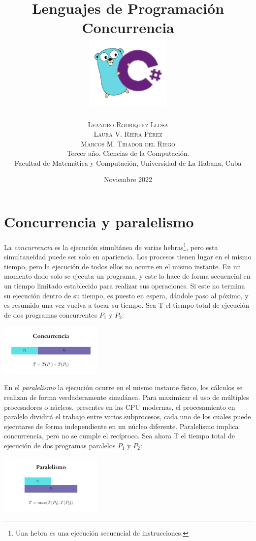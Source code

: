 \documentclass[10pt]{article} %
\title{\normalsize{Lenguajes de Programaci\'on}\\
\Huge\bfseries Concurrencia\\
\includegraphics[height=5em]{go_cs_logo.png}} %
\author{%
\normalsize\textsc{Leandro Rodr\'iquez Llosa}\\
\normalsize\textsc{Laura V. Riera P\'erez}\\ 
\normalsize\textsc{Marcos M. Tirador del Riego} \\[2ex]
\small Tercer a\~no. Ciencias de la Computaci\'on. \\ %
\small Facultad de Matem\'atica y Computaci\'on, Universidad de La Habana, Cuba \\ %
}
\date{\footnotesize Noviembre 2022 } %
\begin{document}
\maketitle


\section{Concurrencia y paralelismo}

La \textit{concurrencia} es la ejecuci\'on simult\'anea de varias hebras\footnote{Una hebra es una ejecuci\'on secuencial de instrucciones.}, pero esta simultaneidad puede ser solo en apariencia. Los procesos tienen lugar en el mismo tiempo, pero la ejecución de todos ellos no ocurre en el mismo instante. En un momento dado solo se ejecuta un programa, y este lo hace de forma secuencial en un tiempo limitado establecido para realizar sus operaciones. Si este no termina su ejecuci\'on dentro de su tiempo, es puesto en espera, d\'andole paso al p\'oximo, y es resumido una vez vuelva a tocar su tiempo. Sea T el tiempo total de ejecuci\'on de dos programas concurrentes $ P_{1} $ y $ P_{2} $: 

\begin{center}
	\includegraphics[width=5cm]{concurrencia.png}
\end{center}

En el \textit{paralelismo} la ejecución ocurre en el mismo instante físico, los c\'alculos se realizan de forma verdaderamente simul\'anea. Para maximizar el uso de múltiples procesadores o n\'ucleos, presentes en las CPU modernas, el procesamiento en paralelo dividirá el trabajo entre varios subprocesos, cada uno de los cuales puede ejecutarse de forma independiente en un núcleo diferente. Paralelismo implica concurrencia, pero no se cumple el rec\'iproco. Sea ahora T el tiempo total de ejecuci\'on de dos programas paralelos $ P_{1} $ y $ P_{2} $:

\begin{center}
	\includegraphics[width=5cm]{paralelismo.png}
\end{center}
\end{document}

